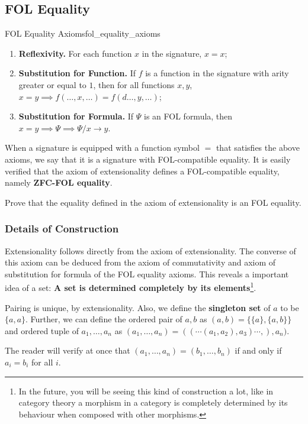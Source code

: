 \documentclass[../main.tex]{subfiles}
\begin{document}
\subsection{FOL Equality}
\begin{axiom}{FOL Equality Axioms}{fol_equality_axioms}
\begin{enumerate}
    \item \textbf{Reflexivity.}  For each function $x$ in the signature, $x=x$;
    \item \textbf{Substitution for Function.}  If $f$ is a function in the signature with arity greater or equal to $1$, then for all functions $x,y$, $x=y\implies f(\dots,x,\dots)=f(d\dots,y,\dots)$;
    \item \textbf{Substitution for Formula.}  If $\Psi$ is an FOL formula, then $x=y\implies\Psi\implies\Psi/x\to y$.
\end{enumerate}
\end{axiom}
When a signature is equipped with a function symbol $=$ that satisfies the above axioms, we say that it is a signature with FOL-compatible equality. It is easily verified that the axiom of extensionality defines a FOL-compatible equality, namely \textbf{ZFC-FOL equality}.

\begin{exercise}
Prove that the equality defined in the axiom of extensionality is an FOL equality.
\end{exercise}

\subsubsection{Details of Construction}
Extensionality follows directly from the axiom of extensionality. The converse of this axiom can be deduced from the axiom of commutativity and axiom of substitution for formula of the FOL equality axioms. This reveals a important idea of a set: \textbf{A set is determined completely by its elements}\footnote{In the future, you will be seeing this kind of construction a lot, like in category theory a morphism in a category is completely determined by its behaviour when composed with other morphisms.}.

Pairing is unique, by extensionality. Also, we define the \textbf{singleton set} of $a$ to be $\{a,a\}$. Further, we can define the ordered pair of $a,b$ as $(a,b)=\{\{a\},\{a,b\}\}$ and ordered tuple of $a_1,\dots,a_n$ as $(a_1,\dots,a_n)=((\cdots(a_1,a_2),a_3)\cdots,),a_n)$.
\begin{exercise}
The reader will verify at once that $(a_1,\dots,a_n)=(b_1,\dots,b_n)$ if and only if $a_i=b_i$ for all $i$.
\end{exercise}
\end{document}
